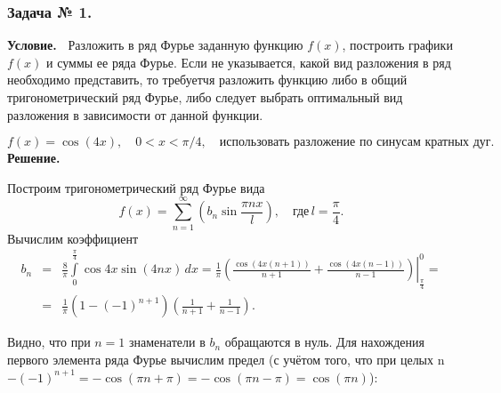 \subsubsection*{\center Задача № 1.}
{\bf Условие.~}
Разложить в ряд Фурье заданную функцию $f(x)$, построить графики $f(x)$ и суммы ее ряда Фурье. Если не указывается, какой вид разложения в ряд необходимо представить, то требуетчя разложить функцию либо в общий тригонометрический ряд Фурье, либо следует выбрать оптимальный вид разложения в зависимости от данной функции.

$$
f(x)= \cos{(4x)}, \quad 0 < x < \pi/4, \quad\text{использовать разложение по синусам кратных дуг.}
$$
{\bf Решение.~}	
\begin{center}
\end{center}
\noindent
Построим тригонометрический ряд Фурье вида
$$
f(x)=\sum_{n=1}^\infty
	\left(b_n \sin\frac{\pi n x}{l}\right),\quad\text{где}\,l=\frac{\pi}{4}.
$$
\noindent
Вычислим коэффициент
$$
\begin{array}{rcl}
b_n &=& \displaystyle\frac{8}{\pi}
	\int\limits_0^\frac {\pi}{4}
	\cos4x \sin(4nx)\,dx =
 \displaystyle\frac{1}{\pi}\left(
	\left.\frac{\cos (4x(n+1))}{n+1} + \frac{\cos (4x(n-1))}{n-1}\right) \right|_\frac{\pi}{4}^0 =	\\[12pt]
	&=& \displaystyle \frac{1}{\pi} \left(1-(-1)^{n+1}\right) \left(\frac{1}{n+1} + \frac{1}{n-1}\right).
\end{array}
$$

Видно, что при $n=1$ знаменатели в $b_n$ обращаются в нуль. Для нахождения первого элемента ряда Фурье вычислим предел (с учётом того, что при целых n
$ -(-1)^{n+1} = -\cos(\pi n + \pi) = -\cos(\pi n - \pi) = \cos(\pi n)$):


